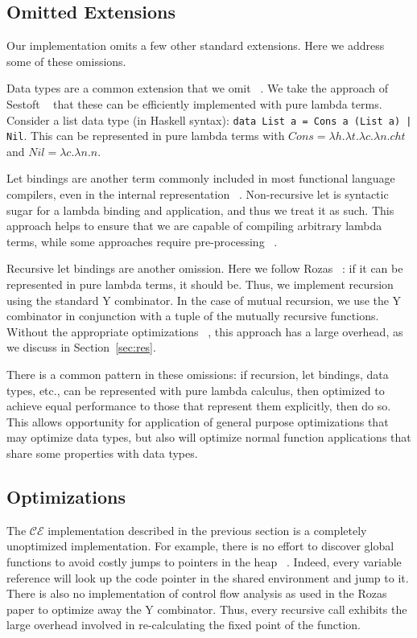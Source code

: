 \subsection{Omitted Extensions}

Our implementation omits a few other standard extensions. Here we address some
of these omissions.

Data types are a common extension that we omit ~\cite{jonesstg,boquist1997grin}.  We take the approach of Sestoft ~\cite{sestoft} that these
can be efficiently implemented with pure lambda terms. Consider a list data type
(in Haskell
syntax): \texttt{data List a = Cons a (List a) | Nil}. This can be represented in
pure lambda terms with $Cons = \lambda h.\lambda t.\lambda c.\lambda n.c h t$
and $Nil = \lambda c.\lambda n.n$. 

Let bindings are another term commonly included in most functional language
compilers, even in the internal representation ~\cite{boquist1997grin,jonesstg}.
Non-recursive let is syntactic sugar for a lambda binding and application, and
thus we treat it as such. This approach helps to ensure that we are capable of
compiling arbitrary lambda terms, while some approaches require pre-processing
~\cite{sestoft,TIM}.

Recursive let bindings are another omission. Here we follow Rozas
~\cite{rozas1992taming}: if it can be represented in pure lambda terms, it should
be. Thus, we implement recursion using the standard Y combinator. In the case of
mutual recursion, we use the Y combinator in conjunction with a tuple of the
mutually recursive functions. Without the appropriate
optimizations ~\cite{rozas1992taming}, this approach has a large overhead, as we
discuss in Section~\ref{sec:res}.

There is a common pattern in these omissions: if recursion, let bindings, data
types, etc., can be represented with pure lambda calculus, then optimized to
achieve equal performance to those that represent them explicitly, then do so.
This allows opportunity for application of general purpose optimizations that
may optimize data types, but also will optimize normal function applications
that share some properties with data types.

\subsection{Optimizations}

The $\mathcal{CE}$ implementation described in the previous section is a
completely unoptimized implementation. For example, there is no effort to
discover global functions to avoid costly jumps to pointers in the heap
~\cite{jonesstg}. Indeed, every variable reference will look up the code pointer
in the shared environment and jump to it. There is also no implementation of 
control flow analysis as used in the Rozas paper to optimize away the Y
combinator.  Thus, every recursive call exhibits the large overhead involved in
re-calculating the fixed point of the function.  

